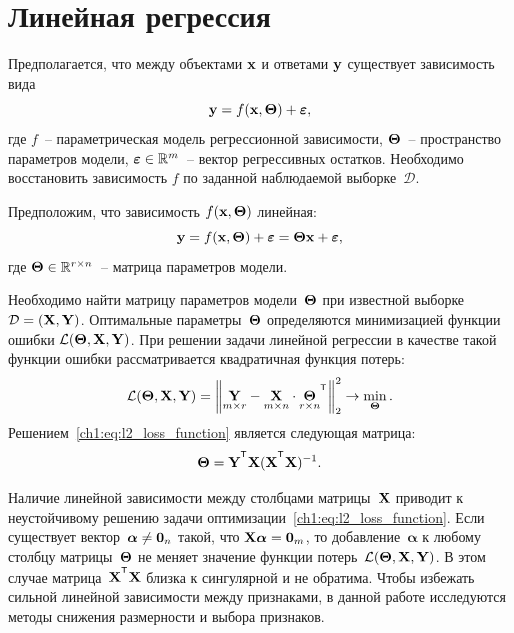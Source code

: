 \section{Линейная регрессия}
\label{ch1:sec_lin_reg}

Предполагается, что между объектами $\mathbf{x}$ и ответами $\mathbf{y}$ существует зависимость вида
\begin{equation}
	\mathbf{y} = f(\mathbf{x}, \boldsymbol{\Theta}) + \boldsymbol{\varepsilon},
	\label{ch1:eq:reg_model}
\end{equation}
где $f$~-- параметрическая модель регрессионной зависимости, $\boldsymbol{\Theta}$~-- пространство параметров модели, $\boldsymbol{\varepsilon} \in \mathbb{R}^{m}$~-- вектор регрессивных остатков. 
Необходимо восстановить зависимость $f$ по заданной наблюдаемой выборке~$\mathcal{D}$.

Предположим, что зависимость $f(\mathbf{x}, \boldsymbol{\Theta})$ линейная:
\begin{equation}
	\mathbf{y} = f(\mathbf{x}, \boldsymbol{\Theta}) + \boldsymbol{\varepsilon} = \boldsymbol{\Theta} \mathbf{x}+ \boldsymbol{\varepsilon},
	\label{ch1:eq:lin_reg_model}
\end{equation}
\noindent где $\boldsymbol{\Theta} \in \mathbb{R}^{r \times n}$~-- матрица параметров модели.

Необходимо найти матрицу параметров модели~$\boldsymbol{\Theta}$ при известной выборке~$\mathcal{D} = \left( \mathbf{X}, \mathbf{Y} \right)$.
Оптимальные параметры~$\boldsymbol{\Theta}$ определяются минимизацией функции ошибки $\mathcal{L}(\boldsymbol{\Theta}, \mathbf{X}, \mathbf{Y})$.
При решении задачи линейной регрессии в качестве такой функции ошибки рассматривается квадратичная функция потерь:
\begin{equation}
	\cL(\bTheta, \bX, \bY) = {\left\| \underset{m \times r}{\mathbf{Y}}  - \underset{m \times n}{\bX} \cdot \underset{r \times n}{\bTheta}^{\T} \right\| }_2^2 \rightarrow\min_{\bTheta}.
	\label{ch1:eq:l2_loss_function}
\end{equation}
Решением~\eqref{ch1:eq:l2_loss_function} является следующая матрица:
\begin{equation*}
	\bTheta = \bY^{\T} \bX (\bX^{\T} \bX)^{-1}.
\end{equation*}

Наличие линейной зависимости между столбцами матрицы~$\mathbf{X}$ приводит к неустойчивому решению задачи оптимизации~\eqref{ch1:eq:l2_loss_function}.
Если существует вектор~$\boldsymbol{\alpha} \neq \boldsymbol{0}_n$ такой, что $\mathbf{X} \boldsymbol{\alpha}= \boldsymbol{0}_m$, то добавление~$\boldsymbol{\alpha}$ к любому столбцу матрицы~$\boldsymbol{\Theta}$ не меняет значение функции потерь~$\mathcal{L}(\boldsymbol{\Theta}, \mathbf{X}, \mathbf{Y})$.
В этом случае матрица~$\bX^{\T} \bX$ близка к сингулярной и не обратима.
Чтобы избежать сильной линейной зависимости между признаками, в данной работе исследуются методы снижения размерности и выбора признаков.


